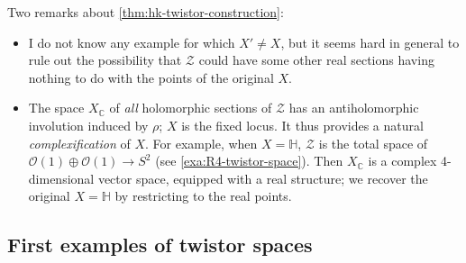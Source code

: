 \documentclass[12pt,letterpaper,reqno]{article}
\numberwithin{equation}{section}
\newcommand{\cZ}{\ensuremath{\mathcal Z}}
\newcommand{\cO}{\ensuremath{\mathcal O}}
\newcommand{\C}{\ensuremath{\mathbb C}}
\newcommand{\bbH}{\ensuremath{\mathbb H}}
\newcommand{\ti}[1]{\textit{#1}}
\begin{document}
Two remarks about \autoref{thm:hk-twistor-construction}:
\begin{itemize}
\item I do not know any example for which $X' \neq X$, but it seems hard
in general to rule out the possibility that $\cZ$ could have some 
other real sections having nothing to do with the points of the original $X$.
\item The space $X_\C$ of \ti{all} holomorphic sections of $\cZ$ has an antiholomorphic
involution induced by $\rho$; $X$ is the fixed locus. It thus provides
a natural \ti{complexification} of $X$. For example, when $X = \bbH$,
$\cZ$ is the total space of $\cO(1) \oplus \cO(1) \to S^2$ 
(see \autoref{exa:R4-twistor-space}).
Then $X_\C$ is a complex 4-dimensional vector space,
equipped with a real structure; we recover the original $X = \bbH$
by restricting to the real points.
\end{itemize}


\subsection{First examples of twistor spaces}
\end{document}
